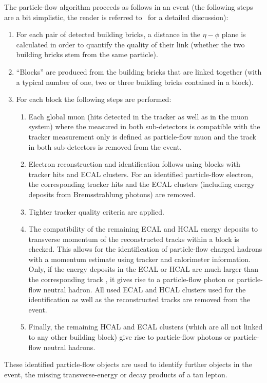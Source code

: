 The particle-flow algorithm proceeds as follows in an event (the following steps are a bit simplistic, the reader is referred to~\cite{CMS-PAS-PFT-09-001} for a detailed discussion):
\begin{enumerate}
\item For each pair of detected building bricks, a distance in the $\eta-\phi$ plane is calculated in order to quantify the quality of their link (whether the two building bricks stem from the same particle). 
\item ``Blocks'' are produced from the building bricks that are linked together (with a typical number of one, two or three building bricks contained in a block).
\item For each block the following steps are performed:
\begin{enumerate}
\item Each global muon (hits detected in the tracker as well as in the muon system) where the \pt measured in both sub-detectors is compatible with the tracker measurement only is defined as particle-flow muon and the track in both sub-detectors is removed from the event.
\item Electron reconstruction and identification follows using blocks with tracker hits and ECAL clusters. 
      For an identified particle-flow electron, the corresponding tracker hits and the ECAL clusters (including energy deposits from Bremsstrahlung photons) are removed. 
\item Tighter tracker quality criteria are applied.
\item The compatibility of the remaining ECAL and HCAL energy deposits to transverse momentum of the reconstructed tracks within a block is checked. 
      This allows for the identification of particle-flow charged hadrons with a momentum estimate using tracker and calorimeter information. 
      Only, if the energy deposits in the ECAL or HCAL are much larger than the corresponding track \pt, it gives rise to a particle-flow photon or particle-flow neutral hadron. 
      All used ECAL and HCAL clusters used for the identification as well as the reconstructed tracks are removed from the event.
\item Finally, the remaining HCAL and ECAL clusters (which are all not linked to any other building block) give rise to particle-flow photons or particle-flow neutral hadrons.
\end{enumerate}
\end{enumerate}
These identified particle-flow objects are used to identify further objects in the event, \eg the missing transverse-energy or decay products of a tau lepton.

